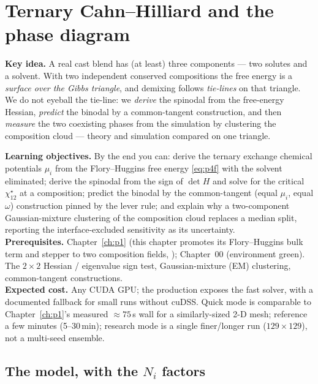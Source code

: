 \chapter{Ternary Cahn--Hilliard and the phase diagram}
\label{ch:p4}

\begin{keybox}
\textbf{Key idea.} A real cast blend has (at least) three components ---
two solutes and a solvent. With two independent conserved compositions
the free energy is a \emph{surface over the Gibbs triangle}, and demixing
follows \emph{tie-lines} on that triangle. We do not eyeball the tie-line:
we \emph{derive} the spinodal from the free-energy Hessian, \emph{predict}
the binodal by a common-tangent construction, and then \emph{measure} the
two coexisting phases from the simulation by clustering the composition
cloud --- theory and simulation compared on one triangle.
\end{keybox}

\begin{keybox}
\textbf{Learning objectives.} By the end you can: derive the ternary
exchange chemical potentials $\mu_i$ from the Flory--Huggins free energy
\eqref{eq:p4f} with the solvent eliminated; derive the spinodal from the
sign of $\det H$ and solve for the critical $\chi_{12}^\star$ at a
composition; predict the binodal by the common-tangent (equal $\mu_i$,
equal $\omega$) construction pinned by the lever rule; and explain why a
two-component Gaussian-mixture clustering of the composition cloud
replaces a median split, reporting the interface-excluded sensitivity as
its uncertainty.\\[2pt]
\textbf{Prerequisites.} Chapter~\ref{ch:p1} (this chapter promotes its
Flory--Huggins bulk term and stepper to two composition fields,
); Chapter~00 (environment green). The $2\times2$ Hessian
/ eigenvalue sign test, Gaussian-mixture (EM) clustering, common-tangent
constructions.\\[2pt]
\textbf{Expected cost.} Any CUDA GPU; the production 
 exposes the fast  solver, with a
documented  fallback for small runs without cuDSS. Quick mode
is comparable to Chapter~\ref{ch:p1}'s measured $\approx75$\,s wall for a
similarly-sized 2-D mesh; reference a few minutes (5--30\,min); research
mode is a single finer/longer run ($129\times129$), not a multi-seed
ensemble.
\end{keybox}

\section{The model, with the \texorpdfstring{$N_i$}{N} factors}

